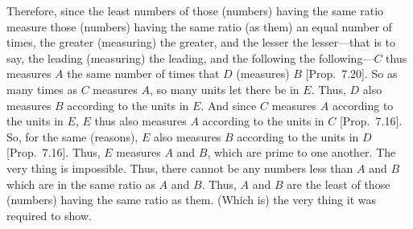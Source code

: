 \begin{Parallel}{}{}
{\epsfysize=1.8in
\centerline{}

Therefore, since the least numbers of those (numbers) having the
same ratio measure those (numbers) having the same ratio (as them)
an equal number of times, the greater (measuring) the greater, and
the lesser  the lesser---that is to say, the leading (measuring) the leading, and
the following the following---$C$ thus measures $A$ the same number of
times that $D$ (measures) $B$  [Prop.~7.20].
So as many times as $C$ measures $A$, so many units let there be in $E$.
Thus, $D$ also measures $B$ according to the units in $E$. And since $C$ measures
$A$ according to the units in $E$, $E$ thus also measures $A$ according to the
units in $C$ [Prop.~7.16]. So, for the
same (reasons), $E$ also measures $B$ according to the units in $D$  [Prop.~7.16]. Thus, $E$ measures $A$ and $B$, which
are prime to one another. The very thing is impossible. Thus, there cannot
be any numbers less than $A$ and $B$ which are in the same ratio as $A$ and
$B$. Thus, $A$ and $B$ are the least of those (numbers) having the same ratio
as them. (Which is) the very thing it was required to show.}
\end{Parallel}

